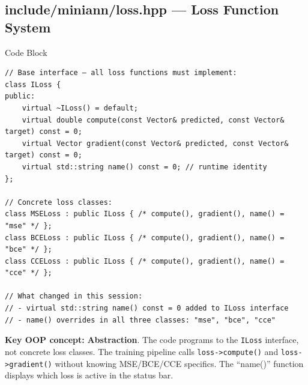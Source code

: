 \documentclass[12pt]{article}
\begin{document}
\subsection{include/miniann/loss.hpp — Loss Function System}
\begin{codebox}{Code Block}
\begin{lstlisting}
// Base interface — all loss functions must implement:
class ILoss {
public:
    virtual ~ILoss() = default;
    virtual double compute(const Vector& predicted, const Vector& target) const = 0;
    virtual Vector gradient(const Vector& predicted, const Vector& target) const = 0;
    virtual std::string name() const = 0; // runtime identity
};

// Concrete loss classes:
class MSELoss : public ILoss { /* compute(), gradient(), name() = "mse" */ };
class BCELoss : public ILoss { /* compute(), gradient(), name() = "bce" */ };
class CCELoss : public ILoss { /* compute(), gradient(), name() = "cce" */ };

// What changed in this session:
// - virtual std::string name() const = 0 added to ILoss interface
// - name() overrides in all three classes: "mse", "bce", "cce"
\end{lstlisting}
\end{codebox}

\textbf{Key OOP concept:} \textbf{Abstraction}. The code programs to the \texttt{ILoss} interface, not concrete loss classes. The training pipeline calls \texttt{loss->compute()} and \texttt{loss->gradient()} without knowing MSE/BCE/CCE specifics. The ``name()'' function displays which loss is active in the status bar.
\end{document}
